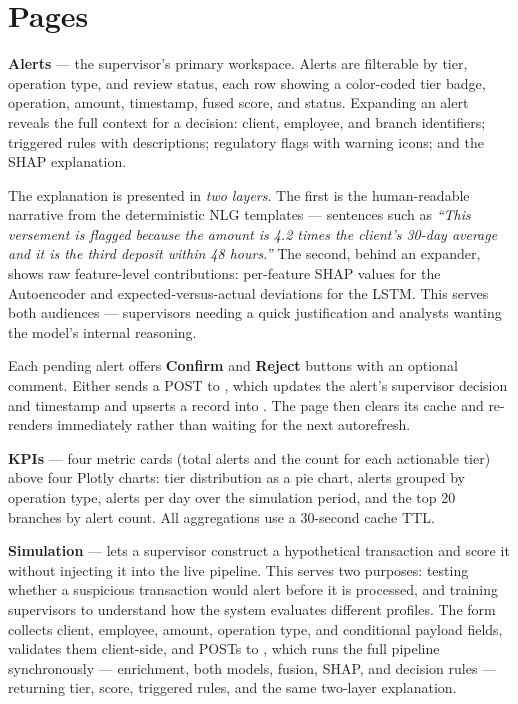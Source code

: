 \section{Pages}

\textbf{Alerts} --- the supervisor's primary workspace. Alerts are filterable by tier, operation type, and review status, each row showing a color-coded tier badge, operation, amount, timestamp, fused score, and status. Expanding an alert reveals the full context for a decision: client, employee, and branch identifiers; triggered rules with descriptions; regulatory flags with warning icons; and the SHAP explanation.

The explanation is presented in \emph{two layers}. The first is the human-readable narrative from the deterministic NLG templates --- sentences such as \emph{``This versement is flagged because the amount is 4.2 times the client's 30-day average and it is the third deposit within 48 hours.''} The second, behind an expander, shows raw feature-level contributions: per-feature SHAP values for the Autoencoder and expected-versus-actual deviations for the LSTM. This serves both audiences --- supervisors needing a quick justification and analysts wanting the model's internal reasoning.

Each pending alert offers \textbf{Confirm} and \textbf{Reject} buttons with an optional comment. Either sends a POST to , which updates the alert's supervisor decision and timestamp and upserts a record into . The page then clears its cache and re-renders immediately rather than waiting for the next autorefresh.

\textbf{KPIs} --- four metric cards (total alerts and the count for each actionable tier) above four Plotly charts: tier distribution as a pie chart, alerts grouped by operation type, alerts per day over the simulation period, and the top 20 branches by alert count. All aggregations use a 30-second cache TTL.

\textbf{Simulation} --- lets a supervisor construct a hypothetical transaction and score it without injecting it into the live pipeline. This serves two purposes: testing whether a suspicious transaction would alert before it is processed, and training supervisors to understand how the system evaluates different profiles. The form collects client, employee, amount, operation type, and conditional payload fields, validates them client-side, and POSTs to , which runs the full pipeline synchronously --- enrichment, both models, fusion, SHAP, and decision rules --- returning tier, score, triggered rules, and the same two-layer explanation.

